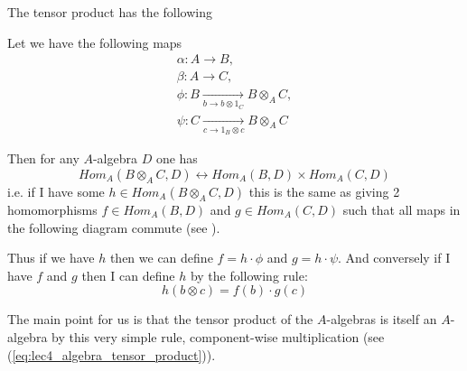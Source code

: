 The tensor product has the following 
\begin{definition}
  Let we have the following maps
  \begin{eqnarray}
    \alpha: A \to B,
    \nonumber \\
    \beta: A \to C,
    \nonumber \\
    \phi: B \xrightarrow[b \to b \otimes 1_C ]{} B \otimes_A C,
    \nonumber \\
    \psi: C \xrightarrow[c \to 1_B \otimes c ]{} B \otimes_A C
    \nonumber
  \end{eqnarray}

  Then for any $A$-algebra $D$ one has
  \[
  Hom_A\left(B \otimes_A C, D\right)
  \leftrightarrow
  Hom_A\left(B, D\right) \times
  Hom_A\left(C, D\right)
  \]
  i.e. if I have some 
  $h \in Hom_A\left(B \otimes_A C, D\right)$ this is the same as
  giving 2 homomorphisms
  $f \in Hom_A\left(B, D\right)$ and
  $g \in Hom_A\left(C, D\right)$ such that all maps in the following
  diagram commute (see ).
  

  Thus if we have $h$ then we can define
  $f = h \cdot \phi$ and $g = h \cdot \psi$. And conversely if I have
  $f$ and $g$ then I can define $h$ by the following rule:
  \[
  h\left(b \otimes c\right) = f(b) \cdot g(c)
  \]
\end{definition}
The main point for us is that the tensor product of the $A$-algebras is
itself an $A$-algebra by this very simple rule, component-wise
multiplication (see (\ref{eq:lec4_algebra_tensor_product})).  

